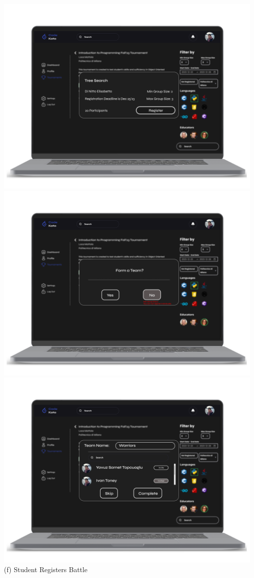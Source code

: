 \newpage
\begin{center}
\includegraphics[scale=0.13]{Images/ui-ux/student_battle_register/student_battle_register_1.png}
\includegraphics[scale=0.13]{Images/ui-ux/student_battle_register/student_battle_register_2.png}
\includegraphics[scale=0.13]{Images/ui-ux/student_battle_register/student_battle_register_3.png}
\\ (f) Student Registers Battle
\end{center}
